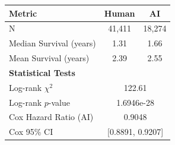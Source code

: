 \begin{tabular}{lcc}
\toprule
\textbf{Metric} & \textbf{Human} & \textbf{AI} \\
\midrule
N & 41,411 & 18,274 \\
Median Survival (years) & 1.31 & 1.66 \\
Mean Survival (years) & 2.39 & 2.55 \\
\midrule
\multicolumn{3}{l}{\textbf{Statistical Tests}} \\
Log-rank $\chi^2$ & \multicolumn{2}{c}{122.61} \\
Log-rank $p$-value & \multicolumn{2}{c}{1.6946e-28} \\
Cox Hazard Ratio (AI) & \multicolumn{2}{c}{0.9048} \\
Cox 95\% CI & \multicolumn{2}{c}{[0.8891, 0.9207]} \\
\bottomrule
\end{tabular}